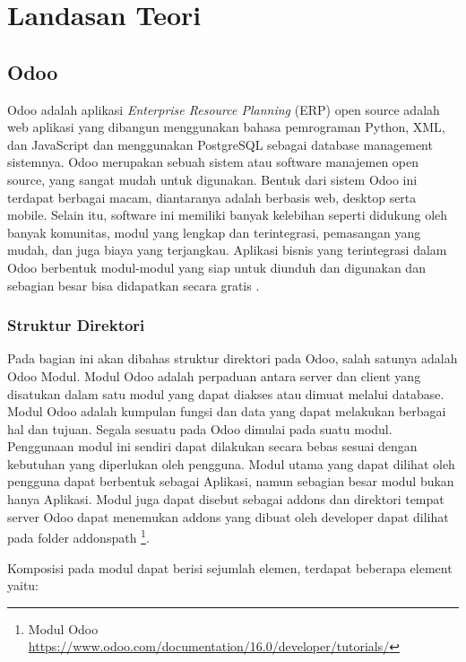 \chapter{Landasan Teori}
\label{sec:landasanteori}

\section{Odoo}
\label{sec:odoo}

Odoo adalah aplikasi \textit{Enterprise Resource Planning} (ERP) open source adalah web aplikasi yang dibangun menggunakan bahasa pemrograman Python, XML, dan JavaScript dan menggunakan PostgreSQL sebagai database management sistemnya.  Odoo merupakan sebuah sistem atau software manajemen open source, yang sangat mudah untuk digunakan. Bentuk dari sistem Odoo ini terdapat berbagai macam, diantaranya adalah berbasis web, desktop serta mobile. Selain itu, software ini memiliki banyak kelebihan seperti didukung oleh banyak komunitas, modul yang lengkap dan terintegrasi, pemasangan yang mudah, dan juga biaya yang terjangkau. Aplikasi bisnis yang terintegrasi dalam Odoo berbentuk modul-modul yang siap untuk diunduh dan digunakan dan sebagian besar bisa didapatkan secara gratis \cite{suminten}.

\subsection{Struktur Direktori}
\label{sec:strukturDirektori}
Pada bagian ini akan dibahas struktur direktori pada Odoo, salah satunya adalah Odoo Modul. Modul Odoo adalah perpaduan antara server dan client yang disatukan dalam satu modul yang dapat diakses atau dimuat melalui database. Modul Odoo adalah kumpulan fungsi dan data yang dapat melakukan berbagai hal dan tujuan. Segala sesuatu pada Odoo dimulai pada suatu modul. Penggunaan modul ini sendiri dapat dilakukan secara bebas sesuai dengan kebutuhan yang diperlukan oleh pengguna. Modul utama yang dapat dilihat oleh pengguna dapat berbentuk sebagai Aplikasi, namun sebagian besar modul bukan hanya Aplikasi. Modul juga dapat disebut sebagai addons dan direktori tempat server Odoo dapat menemukan addons yang dibuat oleh developer dapat dilihat pada folder addonspath \footnote{Modul Odoo \url{https://www.odoo.com/documentation/16.0/developer/tutorials/}}. 

Komposisi pada modul dapat berisi sejumlah elemen, terdapat beberapa element yaitu:


